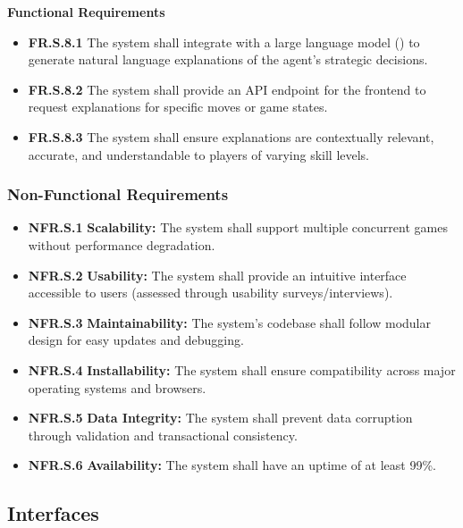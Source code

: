 \documentclass{article}
\begin{document}
\textbf{Functional Requirements}

\begin{itemize}
  \item \label{FR.S.8.1}\textbf{FR.S.8.1} The system shall integrate with a large language model (\LLM{}) to generate natural language explanations of the \AI{} agent's strategic decisions.
  \item \label{FR.S.8.2}\textbf{FR.S.8.2} The system shall provide an API endpoint for the frontend to request explanations for specific moves or game states.
  \item \label{FR.S.8.3}\textbf{FR.S.8.3} The system shall ensure explanations are contextually relevant, accurate, and understandable to players of varying skill levels.
\end{itemize}

\subsubsection{Non-Functional Requirements}

\begin{itemize}
  \item \label{NFR.S.1}\textbf{NFR.S.1} \textbf{Scalability:} The system shall support multiple concurrent games without performance degradation.
  \item \label{NFR.S.2}\textbf{NFR.S.2} \textbf{Usability:} The system shall provide an intuitive interface accessible to users (assessed through usability surveys/interviews).
  \item \label{NFR.S.3}\textbf{NFR.S.3} \textbf{Maintainability:} The system's codebase shall follow modular design for easy updates and debugging.
  \item \label{NFR.S.4}\textbf{NFR.S.4} \textbf{Installability:} The system shall ensure compatibility across major operating systems and browsers.
  \item \label{NFR.S.5}\textbf{NFR.S.5} \textbf{Data Integrity:} The system shall prevent data corruption through validation and transactional consistency.
  \item \label{NFR.S.6}\textbf{NFR.S.6} \textbf{Availability:} The system shall have an uptime of at least 99\%.
\end{itemize}


\subsection{Interfaces}\label{subsec:interfaces}
\end{document}
